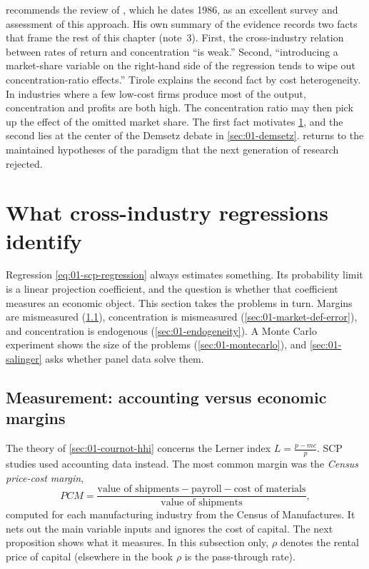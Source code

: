 \citet[Introduction, note~2]{Tirole1988} recommends the review of \citet{Schmalensee1989}, which he dates 1986,
as an excellent survey and assessment of this approach. His own summary of the evidence records two facts that frame the rest
of this chapter (note~3). First, the cross-industry relation between rates of return and concentration ``is weak.'' Second,
``introducing a market-share variable on the right-hand side of the regression tends to wipe out
concentration-ratio effects.'' Tirole explains the second fact by cost heterogeneity. In industries where a few
low-cost firms produce most of the output, concentration and profits are both high. The concentration ratio may
then pick up the effect of the omitted market share. The first fact motivates \cref{sec:01-scp-econometrics},
and the second lies at the center of the Demsetz debate in \cref{sec:01-demsetz}.  returns to the maintained
hypotheses of the paradigm that the next generation of research rejected.

\section{What cross-industry regressions identify}\label{sec:01-scp-econometrics}

Regression \eqref{eq:01-scp-regression} always estimates something. Its probability limit is a
linear projection coefficient, and the question is whether that coefficient measures an economic
object. This section takes the problems in turn. Margins are mismeasured (\cref{sec:01-accounting}),
concentration is mismeasured (\cref{sec:01-market-def-error}), and concentration is endogenous
(\cref{sec:01-endogeneity}). A Monte Carlo experiment shows the size of the problems
(\cref{sec:01-montecarlo}), and \cref{sec:01-salinger} asks whether panel data solve them.

\subsection{Measurement: accounting versus economic margins}\label{sec:01-accounting}

The theory of \cref{sec:01-cournot-hhi} concerns the Lerner index $L = \frac{p - mc}{p}$. SCP studies
used accounting data instead. The most common margin was the \emph{Census price-cost margin},
\begin{equation}\label{eq:01-pcm}
\mathit{PCM} = \frac{\text{value of shipments} - \text{payroll} - \text{cost of materials}}
                    {\text{value of shipments}},
\end{equation}
computed for each manufacturing industry from the Census of Manufactures. It nets out the main variable
inputs and ignores the cost of capital. The next proposition shows what it measures. In this subsection
only, $\rho$ denotes the rental price of capital (elsewhere in the book $\rho$ is the pass-through rate).

